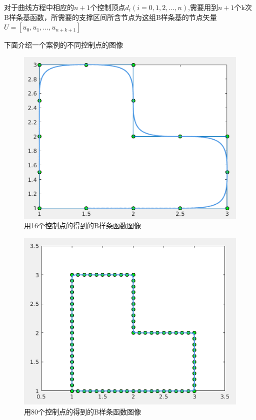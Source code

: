 \documentclass[12pt,a4paper]{article}
\begin{document}
对于曲线方程中相应的$n+1$个控制顶点$d_i(i=0,1,2,...,n)$,需要用到$n+1$个k次B样条基函数，所需要的支撑区间所含节点为这组B样条基的节点矢量$U=[u_0,u_1,...,u_{n+k+1}]$

下面介绍一个案例的不同控制点的图像
\begin{figure}[ht]
	\centering
	\includegraphics[scale=0.6]{./figures/16.png}
	\caption{用16个控制点的得到的B样条函数图像}
	\label{fig:label}
\end{figure}

\begin{figure}[ht]
	\centering
	\includegraphics[scale=0.6]{./figures/80.png}
	\caption{用80个控制点的得到的B样条函数图像}
	\label{fig:label}
\end{figure}
\end{document}
